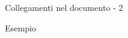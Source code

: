 \begin{frame}[fragile]{Collegamenti nel documento - 2}

\begin{exampleblock}{Esempio}
	
\end{exampleblock}

\end{frame}
